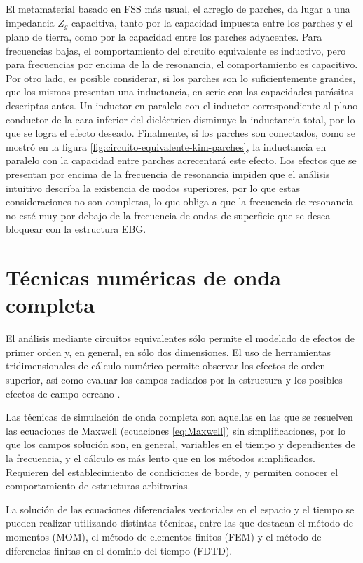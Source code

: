 El metamaterial basado en FSS más usual, el arreglo de parches, da lugar a una impedancia $Z_g$ capacitiva, tanto por la capacidad impuesta entre los parches y el plano de tierra, como por la capacidad entre los parches adyacentes. Para frecuencias bajas, el comportamiento del circuito equivalente es inductivo, pero para frecuencias por encima de la de resonancia, el comportamiento es capacitivo. Por otro lado, es posible considerar, si los parches son lo suficientemente grandes, que los mismos presentan una inductancia, en serie con las capacidades parásitas descriptas antes. Un inductor en paralelo con el inductor correspondiente al plano conductor de la cara inferior del dieléctrico disminuye la inductancia total, por lo que se logra el efecto deseado. Finalmente, si los parches son conectados, como se mostró en la figura \ref{fig:circuito-equivalente-kim-parches}, la inductancia en paralelo con la capacidad entre parches acrecentará este efecto. Los efectos que se presentan por encima de la frecuencia de resonancia impiden que el análisis intuitivo describa la existencia de modos superiores, por lo que estas consideraciones no son completas, lo que obliga a que la frecuencia de resonancia no esté muy por debajo de la frecuencia de ondas de superficie que se desea bloquear con la estructura EBG.

\section{Técnicas numéricas de onda completa}
\label{sec_estructuras_periodicas}

El análisis mediante circuitos equivalentes sólo permite el modelado de efectos de primer orden y, en general, en sólo dos dimensiones. El uso de herramientas tridimensionales de cálculo numérico permite observar los efectos de orden superior, así como evaluar los campos radiados por la estructura y los posibles efectos de campo cercano \cite{Mohajer:SupressionBand}.

Las técnicas de simulación de onda completa son aquellas en las que se resuelven las ecuaciones de Maxwell (ecuaciones \ref{eq:Maxwell}) sin simplificaciones, por lo que los campos solución son, en general, variables en el tiempo y dependientes de la frecuencia, y el cálculo es más lento que en los métodos simplificados. Requieren del establecimiento de condiciones de borde, y permiten conocer el comportamiento de estructuras arbitrarias.

La solución de las ecuaciones diferenciales vectoriales en el espacio y el tiempo se pueden realizar utilizando distintas técnicas, entre las que destacan el método de momentos (MOM), el método de elementos finitos (FEM) y el método de diferencias finitas en el dominio del tiempo (FDTD).

